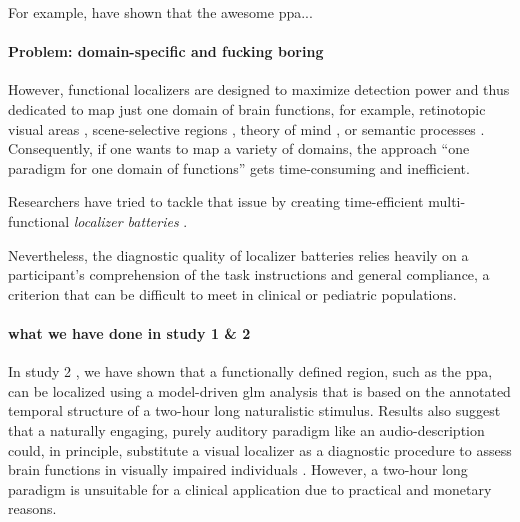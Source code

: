 
For example, \citep{rosenke2021probabilistic, weiner2018defining,
zhen2017quantifying} have shown that the awesome \ac{ppa}...


\paragraph{Problem: domain-specific and fucking boring}

However, functional localizers are designed to maximize detection power and thus
dedicated to map just one domain of brain functions, for example, retinotopic
visual areas \citep{wang2015probabilistic}, scene-selective regions
\citep{stigliani2015temporal}, theory of mind \citep{spunt2014validating}, or
semantic processes \citep{fernandez2001language}.
Consequently, if one wants to map a variety of domains, the approach ``one
paradigm for one domain of functions'' gets time-consuming and inefficient.


Researchers have tried to tackle that issue by creating time-efficient
multi-functional \textit{localizer batteries} \citep[e.g.,][]{barch2013function,
drobyshevsky2006rapid, pinel2007fast}.

Nevertheless, the diagnostic quality of localizer batteries relies heavily on
a participant's comprehension of the task instructions and general compliance,
a criterion that can be difficult to meet in clinical or pediatric populations.


\paragraph{what we have done in study 1 \& 2}

%
In study 2 \citep{haeusler2022processing}, we have shown that a functionally
defined region, such as the \ac{ppa}, can be localized using a model-driven
\ac{glm} analysis that is based on the annotated temporal structure of a
two-hour long naturalistic stimulus.
%
Results also suggest that a naturally engaging, purely auditory paradigm like an
audio-description could, in principle, substitute a visual localizer as a
diagnostic procedure to assess brain functions in visually impaired individuals
\citep{haeusler2022processing}.
%
However, a two-hour long paradigm is unsuitable for a clinical application due
to practical and monetary reasons.


